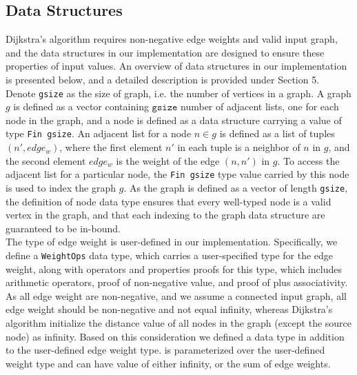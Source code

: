 \subsection{Data Structures}
Dijkstra's algorithm requires non-negative edge weights and valid input graph, and the data structures in our implementation are designed to ensure these properties of input values. An overview of data structures in our implementation is presented below, and a detailed description is provided under Section 5. 
\\

Denote \texttt{gsize} as the size of graph, i.e. the number of vertices in a graph. A graph $g$ is defined as a vector containing $\texttt{gsize}$ number of adjacent lists, one for each node in the graph, and a node is defined as a data structure carrying a value of type \texttt{Fin gsize}. An adjacent list for a node $n \in g$ is defined as a list of tuples $(n', edge_w)$, where the first element $n'$ in each tuple is a neighbor of $n$ in $g$, and the second element $edge_w$ is the weight of the edge $(n, n')$ in $g$. To access the adjacent list for a particular node, the \texttt{Fin gsize} type value carried by this node is used to index the graph $g$. As the graph is defined as a vector of length \texttt{gsize}, the definition of node data type ensures that every well-typed node is a valid vertex in the graph, and that each indexing to the graph data structure are guaranteed to be in-bound.
\\

The type of edge weight is user-defined in our implementation. Specifically, we define a \texttt{WeightOps} data type, which carries a user-specified type for the edge weight, along with operators and properties proofs for this type, which includes arithmetic operators, proof of non-negative value, and proof of plus associativity. As all edge weight are non-negative, and we assume a connected input graph, all edge weight should be non-negative and not equal infinity, whereas Dijkstra's algorithm initialize the distance value of all nodes in the graph (except the source node) as infinity. Based on this consideration we defined a  data type in addition to the user-defined edge weight type.  is parameterized over the user-defined weight type and can have value of either infinity, or the sum of edge weights. 

